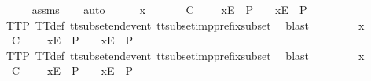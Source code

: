 \begin{isabellebody}
\ \ \ \ \isamarkupfalse%
\ {\isasymsigma}{\isacharunderscore}assms\isanewline
\ \ \isamarkupfalse%
\ auto\isanewline
\ \ \ \ \isamarkupfalse%
\ x\isanewline
\ \ \ \ \isamarkupfalse%
\ {\isachardoublequoteopen}{\isasymrho}{\isacharprime}\ {\isasymsubseteq}\isactrlsub C\ {\isasymrho}{\isacharprime}{\isacharprime}\ {\isasymLongrightarrow}\ {\isasymrho}{\isacharprime}{\isacharprime}\ {\isacharat}\ {\isacharbrackleft}{\isacharbrackleft}x{\isacharbrackright}\isactrlsub E{\isacharbrackright}\ {\isasymin}\ P\ {\isasymLongrightarrow}\ {\isasymrho}{\isacharprime}\ {\isacharat}\ {\isacharbrackleft}{\isacharbrackleft}x{\isacharbrackright}\isactrlsub E{\isacharbrackright}\ {\isasymin}\ P{\isachardoublequoteclose}\isanewline
\ \ \ \ \ \ \isamarkupfalse%
\ TT{}{\isacharunderscore}P\ TT{}{\isacharunderscore}def\ tt{\isacharunderscore}subset{\isacharunderscore}end{\isacharunderscore}event\ tt{\isacharunderscore}subset{\isacharunderscore}imp{\isacharunderscore}prefix{\isacharunderscore}subset\ \isamarkupfalse%
\ blast\isanewline
\ \ \isamarkupfalse%
\isanewline
\ \ \ \ \isamarkupfalse%
\ x\isanewline
\ \ \ \ \isamarkupfalse%
\ {\isachardoublequoteopen}{\isasymrho}{\isacharprime}\ {\isasymsubseteq}\isactrlsub C\ {\isasymrho}{\isacharprime}{\isacharprime}\ {\isasymLongrightarrow}\ {\isasymrho}{\isacharprime}{\isacharprime}\ {\isacharat}\ {\isacharbrackleft}{\isacharbrackleft}x{\isacharbrackright}\isactrlsub E{\isacharbrackright}\ {\isasymin}\ P\ {\isasymLongrightarrow}\ {\isasymrho}{\isacharprime}\ {\isacharat}\ {\isacharbrackleft}{\isacharbrackleft}x{\isacharbrackright}\isactrlsub E{\isacharbrackright}\ {\isasymin}\ P{\isachardoublequoteclose}\isanewline
\ \ \ \ \ \ \isamarkupfalse%
\ TT{}{\isacharunderscore}P\ TT{}{\isacharunderscore}def\ tt{\isacharunderscore}subset{\isacharunderscore}end{\isacharunderscore}event\ tt{\isacharunderscore}subset{\isacharunderscore}imp{\isacharunderscore}prefix{\isacharunderscore}subset\ \isamarkupfalse%
\ blast\isanewline
\ \ \isamarkupfalse%
\isanewline
\ \ \ \ \isamarkupfalse%
\ x\isanewline
\ \ \ \ \isamarkupfalse%
\ {\isachardoublequoteopen}{\isasymrho}{\isacharprime}\ {\isasymsubseteq}\isactrlsub C\ {\isasymrho}{\isacharprime}{\isacharprime}\ {\isasymLongrightarrow}\ {\isasymrho}{\isacharprime}{\isacharprime}\ {\isacharat}\ {\isacharbrackleft}{\isacharbrackleft}x{\isacharbrackright}\isactrlsub E{\isacharbrackright}\ {\isasymin}\ P\ {\isasymLongrightarrow}\ {\isasymrho}{\isacharprime}\ {\isacharat}\ {\isacharbrackleft}{\isacharbrackleft}x{\isacharbrackright}\isactrlsub E{\isacharbrackright}\ {\isasymin}\ P{\isachardoublequoteclose}\isanewline

\end{isabellebody}
